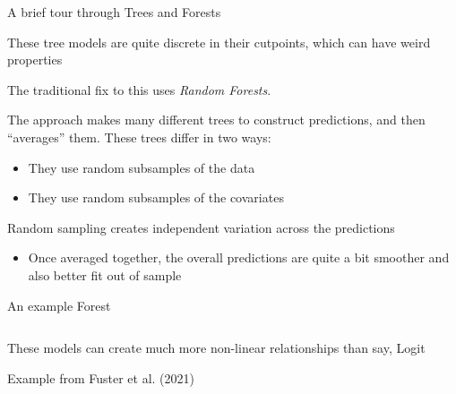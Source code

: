 \documentclass[notes,11pt, aspectratio=169]{beamer}
\newenvironment{wideitemize}{\itemize\addtolength{\itemsep}{10pt}}{\enditemize}
\begin{document}
\begin{frame}{A brief tour through Trees and Forests}
  \begin{wideitemize}
  \item These tree models are quite discrete in their cutpoints, which can have weird properties
  \item The traditional fix to this uses \emph{Random Forests}.
  \item The approach makes many different trees to construct
    predictions, and then ``averages'' them. These trees differ in two ways:
    \begin{itemize}
    \item They use random subsamples of the data
    \item They use random subsamples of the covariates
    \end{itemize}
  \item Random sampling creates independent variation across the predictions
    \begin{itemize}
    \item Once averaged together, the overall predictions are quite a
      bit smoother and also better fit out of sample
    \end{itemize}
  \end{wideitemize}
\end{frame}

\begin{frame}{An example Forest}
  \begin{columns}[onlytextwidth, T] %
    \begin{column}{.4\textwidth}
      \begin{wideitemize}
      \item These models can create much more non-linear relationships
        than say, Logit
      \item Example from Fuster et al. (2021)
      \end{wideitemize}
      \end{column}%
      \hfill%
      \begin{column}{.6\textwidth}
      \end{column}%
    \end{columns}
\end{frame}
\end{document}
